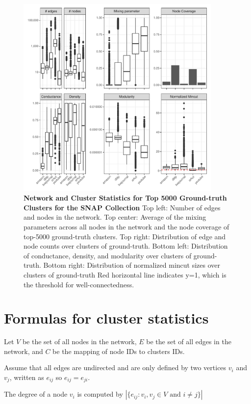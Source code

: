 \documentclass[aps,pre,superscriptaddress]{article}
\begin{document}
\begin{figure}[!htpb]
	\centering
	\includegraphics[width=0.9\textwidth]{figures/snap_groundtruth_top_5000_stats.pdf}
	\caption[]{\textbf{Network and Cluster Statistics for Top 5000 Ground-truth Clusters for the SNAP Collection} Top left: Number of edges and nodes in the network. Top center: Average of the mixing parameters across all nodes in the network and the node coverage of top-5000 ground-truth clusters. Top right: Distribution of edge and node counts over clusters of ground-truth. Bottom left: Distribution of conductance, density, and modularity over clusters of ground-truth. Bottom right: Distribution of normalized mincut sizes over clusters of ground-truth Red horizontal line indicates y=1, which is the threshold for well-connectedness.}
	\label{fig:XXX}
\end{figure}

\clearpage
\section{Formulas for cluster statistics}
Let $V$ be the set of all nodes in the network, $E$ be the set of all edges in the network, and $C$ be the mapping of node IDs to clusters IDs.

Assume that all edges are undirected and are only defined by two vertices $v_{i}$ and $v_{j}$, written as $e_{ij}$ so $e_{ij} = e_{ji}$.

The degree of a node $v_{i}$ is computed by $|\{e_{ij} :v_{i},v_{j} \in V \text{ and } i \neq j\}|$
\end{document}
